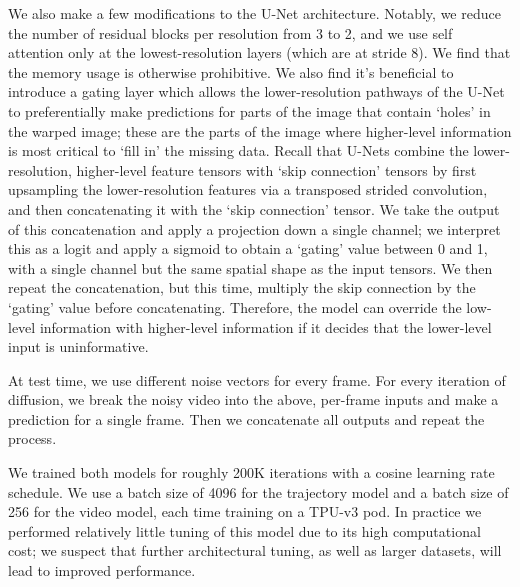 \documentclass[10pt,twocolumn,letterpaper]{article}
\begin{document}
We also make a few modifications to the U-Net architecture.  Notably, we reduce the number of residual blocks per resolution from 3 to 2, and we use self attention only at the lowest-resolution layers (which are at stride 8).  We find that the memory usage is otherwise prohibitive.  We also find it's beneficial to introduce a gating layer which allows the lower-resolution pathways of the U-Net to preferentially make predictions for parts of the image that contain `holes' in the warped image; these are the parts of the image where higher-level information is most critical to `fill in' the missing data.  Recall that U-Nets combine the lower-resolution, higher-level feature tensors with `skip connection' tensors by first upsampling the lower-resolution features via a transposed strided convolution, and then concatenating it with the `skip connection' tensor.  We take the output of this concatenation and apply a projection down a single channel; we interpret this as a logit and apply a sigmoid to obtain a `gating' value between 0 and 1, with a single channel but the same spatial shape as the input tensors.  We then repeat the concatenation, but this time, multiply the skip connection by the `gating' value before concatenating.  Therefore, the model can override the low-level information with higher-level information if it decides that the lower-level input is uninformative.  

At test time, we use different noise vectors for every frame.  For every iteration of diffusion, we break the noisy video into the above, per-frame inputs and make a prediction for a single frame.  Then we concatenate all outputs and repeat the process.

We trained both models for roughly 200K iterations with a cosine learning rate schedule.  We use a batch size of 4096 for the trajectory model and a batch size of 256 for the video model, each time training on a  TPU-v3 pod.  In practice we performed relatively little tuning of this model due to its high computational cost; we suspect that further architectural tuning, as well as larger datasets, will lead to improved performance.
\end{document}
